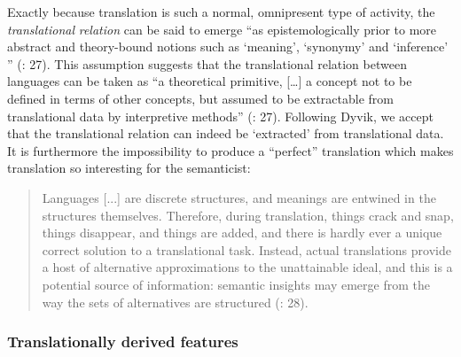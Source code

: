 Exactly because translation is such a normal, omnipresent type of activity, the \textit{translational} \textit{relation} can be said to emerge “as epistemologically prior to more abstract and theory-bound notions such as ‘meaning’, ‘synonymy’ and ‘inference’ ” (\citealt{langemets_translations_2005}: 27). This assumption suggests that the translational relation between languages can be taken as “a theoretical primitive, […] a concept not to be defined in terms of other concepts, but assumed to be extractable from translational data by interpretive methods” (\citealt{langemets_translations_2005}: 27). Following Dyvik, we accept that the translational relation can indeed be ‘extracted’ from translational data. It is furthermore the impossibility to produce a “perfect” translation which makes translation so interesting for the semanticist:


\begin{quote}
Languages [...] are discrete structures, and meanings are entwined in the structures themselves. Therefore, during translation, things crack and snap, things disappear, and things are added, and there is hardly ever a unique correct solution to a translational task. Instead, actual translations provide a host of alternative approximations to the unattainable ideal, and this is a potential source of information: semantic insights may emerge from the way the sets of alternatives are structured (\citealt{langemets_translations_2005}: 28).
\end{quote}

\subsubsection{\label{sec:2.3.4.2}  Translationally derived features}

